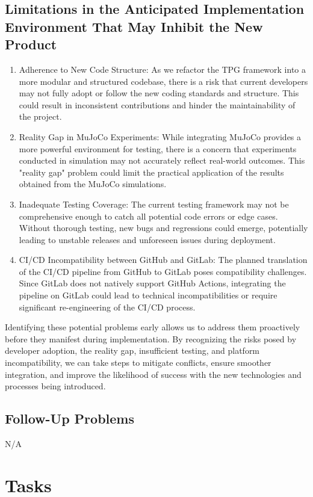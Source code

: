 \documentclass[12pt]{article}
\begin{document}
\subsection{Limitations in the Anticipated Implementation Environment That May
Inhibit the New Product}
\begin{enumerate}
  \item Adherence to New Code Structure: As we refactor the TPG framework into a more modular and structured codebase, there is a risk that current developers may not fully adopt or follow the new coding standards and structure. This could result in inconsistent contributions and hinder the maintainability of the project.
  \item Reality Gap in MuJoCo Experiments: While integrating MuJoCo provides a more powerful environment for testing, there is a concern that experiments conducted in simulation may not accurately reflect real-world outcomes. This "reality gap" problem could limit the practical application of the results obtained from the MuJoCo simulations.
  \item Inadequate Testing Coverage: The current testing framework may not be comprehensive enough to catch all potential code errors or edge cases. Without thorough testing, new bugs and regressions could emerge, potentially leading to unstable releases and unforeseen issues during deployment.
  \item CI/CD Incompatibility between GitHub and GitLab: The planned translation of the CI/CD pipeline from GitHub to GitLab poses compatibility challenges. Since GitLab does not natively support GitHub Actions, integrating the pipeline on GitLab could lead to technical incompatibilities or require significant re-engineering of the CI/CD process.
\end{enumerate}

Identifying these potential problems early allows us to address them proactively before they manifest during implementation. By recognizing the risks posed by developer adoption, the reality gap, insufficient testing, and platform incompatibility, we can take steps to mitigate conflicts, ensure smoother integration, and improve the likelihood of success with the new technologies and processes being introduced.

\subsection{Follow-Up Problems}
N/A

\section{Tasks}
\end{document}
